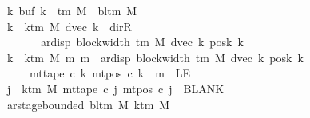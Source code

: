 \begin{isabellebody}
\ \ \ \ \ \ \ \ \ \ \ \ \ \ \ \ \ {\isasymforall}k{\isachardot}{\kern0pt}\ buf{}\ k\ {\isasymin}\ {\isasymGamma}{\isacharunderscore}{\kern0pt}tm\ M\ {\isasymunion}\ {\isacharbraceleft}{\kern0pt}bl{\isacharunderscore}{\kern0pt}tm\ M{\isacharbraceright}{\kern0pt}{\isacharsemicolon}{\kern0pt}\isanewline
\ \ \ \ \ \ \ \ \ \ \ \ \ \ \ \ \ {\isasymforall}k\ {\isacharless}{\kern0pt}\ k{\isacharunderscore}{\kern0pt}tm\ M{\isachardot}{\kern0pt}\ dvec\ k\ {\isasymnoteq}\ dir{\isachardot}{\kern0pt}R\isanewline
\ \ \ \ \ \ \ \ \ \ \ \ \ \ \ \ \ \ \ \ {\isasymlongrightarrow}\ {}\ {\isacharless}{\kern0pt}\ ar{\isacharunderscore}{\kern0pt}disp\ {\isacharparenleft}{\kern0pt}block{\isacharunderscore}{\kern0pt}width\ {\isacharparenleft}{\kern0pt}{\isasymGamma}{\isacharunderscore}{\kern0pt}tm\ M{\isacharparenright}{\kern0pt}{\isacharparenright}{\kern0pt}\ {\isacharparenleft}{\kern0pt}dvec\ k{\isacharparenright}{\kern0pt}\ {\isacharparenleft}{\kern0pt}posk{}\ k{\isacharparenright}{\kern0pt}{\isacharsemicolon}{\kern0pt}\isanewline
\ \ \ \ \ \ \ \ \ \ \ \ \ \ \ \ \ {\isasymforall}k\ {\isacharless}{\kern0pt}\ k{\isacharunderscore}{\kern0pt}tm\ M{\isachardot}{\kern0pt}\ {\isasymforall}m{\isachardot}{\kern0pt}\ m\ {\isacharless}{\kern0pt}\ ar{\isacharunderscore}{\kern0pt}disp\ {\isacharparenleft}{\kern0pt}block{\isacharunderscore}{\kern0pt}width\ {\isacharparenleft}{\kern0pt}{\isasymGamma}{\isacharunderscore}{\kern0pt}tm\ M{\isacharparenright}{\kern0pt}{\isacharparenright}{\kern0pt}\ {\isacharparenleft}{\kern0pt}dvec\ k{\isacharparenright}{\kern0pt}\ {\isacharparenleft}{\kern0pt}posk{}\ k{\isacharparenright}{\kern0pt}\isanewline
\ \ \ \ \ \ \ \ \ \ \ \ \ \ \ \ \ \ \ \ {\isasymlongrightarrow}\ mt{\isacharunderscore}{\kern0pt}tape\ c{}\ k\ {\isacharparenleft}{\kern0pt}mt{\isacharunderscore}{\kern0pt}pos\ c{}\ k\ {\isacharminus}{\kern0pt}\ m{\isacharparenright}{\kern0pt}\ {\isasymnoteq}\ LE{}{\isacharsemicolon}{\kern0pt}\isanewline
\ \ \ \ \ \ \ \ \ \ \ \ \ \ \ \ \ {\isasymforall}j\ {\isasymge}\ k{\isacharunderscore}{\kern0pt}tm\ M{\isachardot}{\kern0pt}\ mt{\isacharunderscore}{\kern0pt}tape\ c{}\ j\ {\isacharparenleft}{\kern0pt}mt{\isacharunderscore}{\kern0pt}pos\ c{}\ j{\isacharparenright}{\kern0pt}\ {\isacharequal}{\kern0pt}\ BLANK{}{\isacharsemicolon}{\kern0pt}\isanewline
\ \ \ \ \ \ \ \ \ \ \ \ \ \ \ \ \ ar{\isacharunderscore}{\kern0pt}stage{\isacharunderscore}{\kern0pt}bounded\ {\isacharparenleft}{\kern0pt}bl{\isacharunderscore}{\kern0pt}tm\ M{\isacharparenright}{\kern0pt}\ {\isacharparenleft}{\kern0pt}k{\isacharunderscore}{\kern0pt}tm\ M{\isacharparenright}{\kern0pt}\isanewline

\end{isabellebody}
